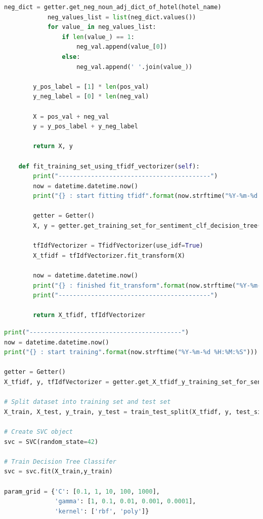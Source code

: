 \documentclass[a4paper]{report}
\begin{document}
{{\begin{lstlisting}[language=Python,label={lst:tfidf},caption={Document term matrix using TF-IDF.} ]
            neg_dict = getter.get_neg_noun_adj_dict_of_hotel(hotel_name)
            neg_values_list = list(neg_dict.values())
            for value_ in neg_values_list:
                if len(value_) == 1:
                    neg_val.append(value_[0])
                else:
                    neg_val.append(' '.join(value_))

        y_pos_label = [1] * len(pos_val)
        y_neg_label = [0] * len(neg_val)    
        
        X = pos_val + neg_val
        y = y_pos_label + y_neg_label

        return X, y

    def fit_training_set_using_tfidf_vectorizer(self):
        print("------------------------------------------")
        now = datetime.datetime.now()
        print("{} : start fitting tfidf".format(now.strftime("%Y-%m-%d %H:%M:%S")))

        getter = Getter()
        X, y = getter.get_training_set_for_sentiment_clf_decision_tree()
        
        tfIdfVectorizer = TfidfVectorizer(use_idf=True)
        X_tfidf = tfIdfVectorizer.fit_transform(X)

        now = datetime.datetime.now()
        print("{} : finished fit_transform".format(now.strftime("%Y-%m-%d %H:%M:%S")))
        print("------------------------------------------")

        return X_tfidf, tfIdfVectorizer
\end{lstlisting}
\begin{lstlisting}[language=Python,label={lst:GridSearchCV},caption={GridSearchCV to find best SVC classifier.} ]
print("------------------------------------------")
now = datetime.datetime.now()
print("{} : start training".format(now.strftime("%Y-%m-%d %H:%M:%S")))

getter = Getter()
X_tfidf, y, tfIdfVectorizer = getter.get_X_tfidf_y_training_set_for_sentiment_clf_decision_tree()

# Split dataset into training set and test set
X_train, X_test, y_train, y_test = train_test_split(X_tfidf, y, test_size=0.2, random_state=42)

# Create SVC object
svc = SVC(random_state=42)

# Train Decision Tree Classifer
svc = svc.fit(X_train,y_train)

param_grid = {'C': [0.1, 1, 10, 100, 1000], 
              'gamma': [1, 0.1, 0.01, 0.001, 0.0001],
              'kernel': ['rbf', 'poly']} 


\end{lstlisting}}}
\end{document}
